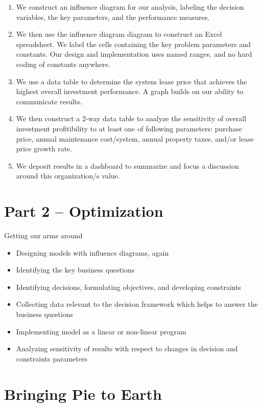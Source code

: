 \documentclass[
]{book}
\begin{document}
\begin{enumerate}
\def\labelenumi{\arabic{enumi}.}
\item
  We construct an influence diagram for our analysis, labeling the decision variables, the key parameters, and the performance measures.
\item
  We then use the influence diagram diagram to construct an Excel spreadsheet. We label the cells containing the key problem parameters and constants. Our design and implementation uses named ranges, and no hard coding of constants anywhere.
\item
  We use a data table to determine the system lease price that achieves the highest overall investment performance. A graph builds on our ability to communicate results.
\item
  We then construct a 2-way data table to analyze the sensitivity of overall investment profitibility to at least one of following parameters: purchase price, annual maintenance cost/system, annual property taxes, and/or lease price growth rate.
\item
  We deposit results in a dashboard to summarize and focus a discussion around this organization/s value.
\end{enumerate}

\hypertarget{part-2-optimization}{%
\chapter*{Part 2 -- Optimization}\label{part-2-optimization}}

Getting our arms around

\begin{itemize}
\item
  Designing models with influence diagrams, again
\item
  Identifying the key business questions
\item
  Identifying decisions, formulating objectives, and developing constraints
\item
  Collecting data relevant to the decision framework which helps to answer the business questions
\item
  Implementing model as a linear or non-linear program
\item
  Analyzing sensitivity of results with respect to changes in decision and constraints parameters
\end{itemize}

\hypertarget{bringing-pie-to-earth}{%
\chapter{Bringing Pie to Earth}\label{bringing-pie-to-earth}}
\end{document}
